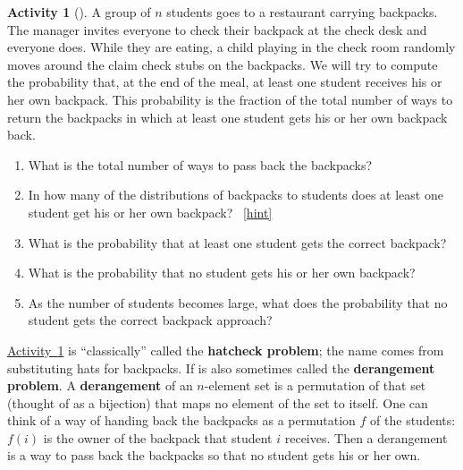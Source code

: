 \documentclass[10pt,]{book}
\newcommand{\terminology}[1]{\textbf{#1}}
\theoremstyle{plain}
\theoremstyle{definition}
\theoremstyle{definition}
\theoremstyle{definition}
\newtheorem{activity}[project]{Activity}
\numberwithin{equation}{chapter}
\begin{document}
\begin{activity}[]\label{hatcheck}
\hypertarget{p-767}{}%
A group of \(n\) students goes to a restaurant carrying backpacks. The manager invites everyone to check their backpack at the check desk and everyone does. While they are eating, a child playing in the check room randomly moves around the claim check stubs on the backpacks. We will try to compute the probability that, at the end of the meal, at least one student receives his or her own backpack.  This probability is the fraction of the total number of ways to return the backpacks in which at least one student gets his or her own backpack back.%
\begin{enumerate}[font=\bfseries,label=(\alph*),ref=\alph*]
\item\label{task-156} \hypertarget{p-768}{}%
What is the total number of ways to pass back the backpacks?%
\item\label{task-157} \hypertarget{p-770}{}%
In how many of the distributions of backpacks to students does at least one student get his or her own backpack?%
~\hfill{\tiny\hyperlink{a-160.b}{[hint]}\hypertarget{q-160.b}{}}\item\label{task-158} \hypertarget{p-774}{}%
What is the probability that at least one student gets the correct backpack?%
\item\label{hatcheckprobpart} \hypertarget{p-776}{}%
What is the probability that no student gets his or her own backpack?%
\item\label{task-160} \hypertarget{p-778}{}%
As the number of students becomes large, what does the probability that no student gets the correct backpack approach?%
\end{enumerate}
\end{activity}
\hypertarget{p-780}{}%
\hyperref[hatcheck]{Activity~\ref{hatcheck}} is ``classically'' called the \terminology{hatcheck problem}; the name comes from substituting hats for backpacks. If is also sometimes called the \terminology{derangement problem}. A \terminology{derangement} of an \(n\)-element set is a permutation of that set (thought of as a bijection) that maps no element of the set to itself. One can think of a way of handing back the backpacks as a permutation \(f\) of the students: \(f(i)\) is the owner of the backpack that student \(i\) receives. Then a derangement is a way to pass back the backpacks so that no student gets his or her own.%
\typeout{************************************************}
\typeout{************************************************}
\end{document}
